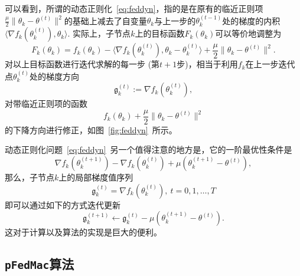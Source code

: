 

可以看到，所谓的动态正则化~\eqref{eq:feddyn}，指的是在原有的临近正则项$\frac{\mu}{2} \lVert \theta_k - \theta^{(t)} \rVert^2$的基础上减去了自变量$\theta_k$与上一步的$\theta_k^{(t-1)}$处的梯度的内积$\langle \nabla f_k(\theta_k^{(t)}), \theta_k \rangle.$ 实际上，子节点$k$上的目标函数$F_k(\theta_k)$可以等价地调整为
\begin{equation}
\label{eq:feddyn-adjusted}
F_k(\theta_k) = f_k(\theta_k) - \langle \nabla f_k(\theta_k^{(t)}), \theta_k - \theta_k^{(t)} \rangle + \frac{\mu}{2} \lVert \theta_k - \theta^{(t)} \rVert^2.
\end{equation}
对以上目标函数进行迭代求解的每一步 (第$t+1$步)，相当于利用$f_k$在上一步迭代点$\theta_k^{(t)}$处的梯度方向
\begin{equation*}\mathfrak{g}_k^{(t)} := \nabla f_k(\theta_k^{(t)}),
\end{equation*}
对带临近正则项的函数
\begin{equation*}
f_k(\theta_k) + \frac{\mu}{2} \lVert \theta_k - \theta^{(t)} \rVert^2
\end{equation*}
的下降方向进行修正，如图~\ref{fig:feddyn}~所示。



动态正则化问题~\eqref{eq:feddyn}~另一个值得注意的地方是，它的一阶最优性条件是
\begin{equation}
\label{eq:feddyn-opt-cond}
\nabla f_k(\theta_k^{(t+1)}) - \nabla f_k(\theta_k^{(t)}) + \mu \left( \theta_k^{(t+1)} - \theta^{(t)} \right),
\end{equation}
那么，子节点$k$上的局部梯度值序列
\begin{equation*}
\mathfrak{g}_k^{(t)} = \nabla f_k(\theta_k^{(t)}), ~ t = 0, 1, \ldots, T
\end{equation*}
即可以通过如下的方式迭代更新
\begin{equation}
\label{eq:feddyn-grad-iter}
\mathfrak{g}_k^{(t+1)} \gets \mathfrak{g}_k^{(t)} - \mu (\theta_k^{(t+1)} - \theta^{(t)}).
\end{equation}
这对于计算以及算法的实现是巨大的便利。


\subsection*{\texttt{pFedMac}算法}

